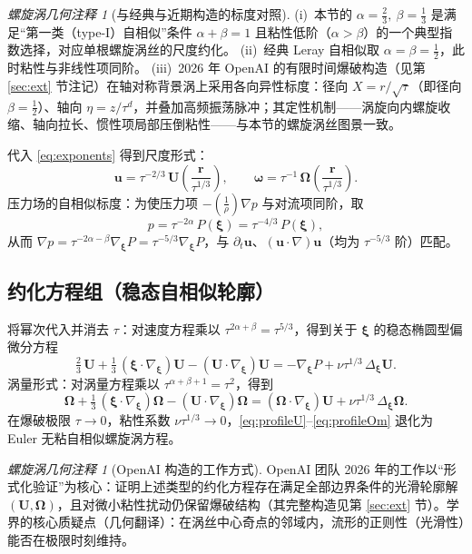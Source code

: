 \documentclass[11pt,a4paper]{article}
\newcommand{\bxi}{\bm{\xi}}
\newcommand{\bu}{\bm{u}}
\newcommand{\bU}{\bm{U}}
\newcommand{\bom}{\bm{\omega}}
\newcommand{\bOm}{\bm{\Omega}}
\newcommand{\br}{\bm{r}}
\theoremstyle{remark}
\newtheorem{remark}[theorem]{螺旋涡几何注释}
\begin{document}
\begin{remark}[与经典与近期构造的标度对照]
(i)~本节的 $\alpha=\frac23,\ \beta=\frac13$ 是满足“第一类（type-I）自相似”条件 $\alpha+\beta=1$ 且粘性低阶（$\alpha>\beta$）的一个典型指数选择，对应单根螺旋涡丝的尺度约化。
(ii)~经典 Leray 自相似取 $\alpha=\beta=\frac12$，此时粘性与非线性项同阶。
(iii)~2026 年 OpenAI 的有限时间爆破构造（见第 \ref{sec:ext} 节注记）在轴对称背景涡上采用各向异性标度：径向 $X=r/\sqrt{\tau}$（即径向 $\beta=\frac12$）、轴向 $\eta=z/\tau^{d}$，并叠加高频振荡脉冲；其定性机制——涡旋向内螺旋收缩、轴向拉长、惯性项局部压倒粘性——与本节的螺旋涡丝图景一致。
\end{remark}

代入 \eqref{eq:exponents} 得到尺度形式：
\begin{equation}
\label{eq:scaled}
\bu=\tau^{-2/3}\,\bU\!\left(\frac{\br}{\tau^{1/3}}\right),\qquad
\bom=\tau^{-1}\,\bOm\!\left(\frac{\br}{\tau^{1/3}}\right).
\end{equation}
压力场的自相似标度：为使压力项 $-(\frac1\rho)\nabla p$ 与对流项同阶，取
\begin{equation}
p=\tau^{-2\alpha}\,P(\bxi)=\tau^{-4/3}\,P(\bxi),
\end{equation}
从而 $\nabla p=\tau^{-2\alpha-\beta}\nabla_{\bxi}P=\tau^{-5/3}\nabla_{\bxi}P$，与 $\partial_t\bu$、$(\bu\cdot\nabla)\bu$（均为 $\tau^{-5/3}$ 阶）匹配。

\subsection{约化方程组（稳态自相似轮廓）}

将幂次代入并消去 $\tau$：对速度方程乘以 $\tau^{2\alpha+\beta}=\tau^{5/3}$，得到关于 $\bxi$ 的稳态椭圆型偏微分方程
\begin{equation}
\label{eq:profileU}
\tfrac23\,\bU+\tfrac13\,(\bxi\cdot\nabla_{\bxi})\bU-(\bU\cdot\nabla_{\bxi})\bU
=-\nabla_{\bxi}P+\nu\tau^{1/3}\,\Delta_{\bxi}\bU.
\end{equation}
涡量形式：对涡量方程乘以 $\tau^{\alpha+\beta+1}=\tau^{2}$，得到
\begin{equation}
\label{eq:profileOm}
\bOm+\tfrac13\,(\bxi\cdot\nabla_{\bxi})\bOm-(\bU\cdot\nabla_{\bxi})\bOm
=(\bOm\cdot\nabla_{\bxi})\bU+\nu\tau^{1/3}\,\Delta_{\bxi}\bOm.
\end{equation}
在爆破极限 $\tau\to0$，粘性系数 $\nu\tau^{1/3}\to0$，\eqref{eq:profileU}--\eqref{eq:profileOm} 退化为 Euler 无粘自相似螺旋涡方程。

\begin{remark}[OpenAI 构造的工作方式]
OpenAI 团队 2026 年的工作以“形式化验证”为核心：证明上述类型的约化方程存在满足全部边界条件的光滑轮廓解 $(\bU,\bOm)$，且对微小粘性扰动仍保留爆破结构（其完整构造见第 \ref{sec:ext} 节）。学界的核心质疑点（几何翻译）：在涡丝中心奇点的邻域内，流形的正则性（光滑性）能否在极限时刻维持。
\end{remark}
\end{document}

